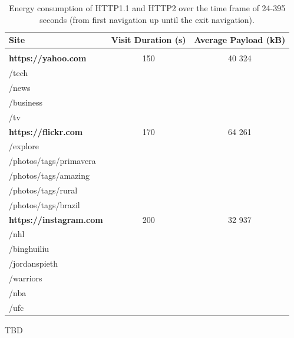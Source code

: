 \documentclass{article}
\begin{document}




\begin{table}[h!]
    \caption{Energy consumption of HTTP1.1 and HTTP2 over the time frame of 24-395 seconds (from first navigation up until the exit navigation).}
    \label{table:url_manifest}
    \begin{tabular}{lcc}
        \textbf{Site} & \textbf{Visit Duration (s)} & \textbf{Average Payload (kB)} \\
        \hline \vspace{-3mm}\\
        \textbf{https://yahoo.com} & 150 & 40 324 \\
        \hspace{1em} /tech \\
        \hspace{1em} /news \\
        \hspace{1em} /business \\
        \hspace{1em} /tv \vspace{1mm}\\
        \textbf{https://flickr.com} & 170 & 64 261 \\
        \hspace{1em} /explore \\
        \hspace{1em} /photos/tags/primavera \\
        \hspace{1em} /photos/tags/amazing \\
        \hspace{1em} /photos/tags/rural \\
        \hspace{1em} /photos/tags/brazil \vspace{1mm}\\
        \textbf{https://instagram.com} & 200 & 32 937 \\
        \hspace{1em} /nhl \\
        \hspace{1em} /binghuiliu \\
        \hspace{1em} /jordanspieth \\
        \hspace{1em} /warriors \\
        \hspace{1em} /nba \\
        \hspace{1em} /ufc \vspace{1mm}\\
    \end{tabular}
\end{table}
TBD
\end{document}
